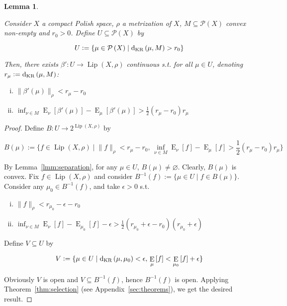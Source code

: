 \documentclass[aop,preprint]{imsart}
\numberwithin{equation}{section}
\theoremstyle{definition}
\theoremstyle{plain}
\newtheorem{lemma}{Lemma}[section]
\newcommand{\N}[1]{\lVert #1 \rVert}
\DeclareMathOperator{\E}{E}
\newcommand{\PM}{\mathcal{P}}
\newcommand{\Lp}{{\operatorname{Lip}}}
\newcommand{\DKR}{\operatorname{d}_{\textnormal{KR}}}
\begin{document}
\begin{samepage}
\begin{lemma}
\label{lmm:savvy_outside}

Consider $X$ a compact Polish space, $\rho$ a metrization of $X$, $M \subseteq \PM\left(X\right)$ convex non-empty and $r_0 > 0$. Define $U \subseteq \PM\left(X\right)$ by

\begin{equation*}
U := \{\mu \in \PM\left(X\right) \mid \DKR\left(\mu,M\right) > r_0\}
\end{equation*}

Then, there exists $\beta': U \rightarrow \Lp\left(X,\rho\right)$ continuous s.t. for all $\mu \in U$, denoting $r_\mu:=\DKR\left(\mu,M\right)$:

\begin{enumerate}[i.]

\item $\N{\beta'\left(\mu\right)}_\rho < r_\mu - r_0$
\item $\inf_{\nu \in M} \E_\nu\left[\beta'\left(\mu\right)\right] - \E_\mu\left[\beta'\left(\mu\right)\right] > \frac{1}{2} \left(r_\mu - r_0\right) r_\mu$

\end{enumerate}

\end{lemma}
\end{samepage}

\begin{proof}

Define $B: U \rightarrow 2^{\Lp\left(X,\rho\right)}$ by

$$B\left(\mu\right):=\{f \in \Lp\left(X,\rho\right) \mid \N{f}_\rho < r_\mu - r_0,\, \inf_{\nu \in M} \E_\nu\left[f\right] - \E_\mu\left[f\right] > \frac{1}{2}\left(r_\mu - r_0\right) r_\mu\}$$

By Lemma~\ref{lmm:separation}, for any $\mu \in U$, $B\left(\mu\right) \ne \varnothing$. Clearly, $B\left(\mu\right)$ is convex. Fix $f \in \Lp\left(X,\rho\right)$ and consider $B^{-1}\left(f\right):=\{\mu \in U \mid f \in B\left(\mu\right)\}$. Consider any $\mu_0 \in B^{-1}\left(f\right)$, and take $\epsilon > 0$ s.t.

\begin{enumerate}[i.]

\item $\N{f}_\rho < r_{\mu_0}  - \epsilon - r_0$
\item $\inf_{\nu \in M} \E_\nu\left[f\right] - \E_{\mu_0}\left[f\right] -\epsilon > \frac{1}{2}\left(r_{\mu_0} + \epsilon  - r_0\right) \left(r_{\mu_0} + \epsilon\right)$

\end{enumerate}

Define $V \subseteq U$ by 

$$V := \{\mu \in U \mid \DKR\left(\mu,\mu_0\right) < \epsilon,\, \E_\mu\left[f\right] < \E_{\mu_0}\left[f\right] + \epsilon\}$$

Obviously $V$ is open and $V \subseteq B^{-1}\left(f\right)$, hence $B^{-1}\left(f\right)$ is open. Applying Theorem~\ref{thm:selection} (see Appendix~\ref{sec:theorems}), we get the desired result.
\end{proof}
\end{document}
